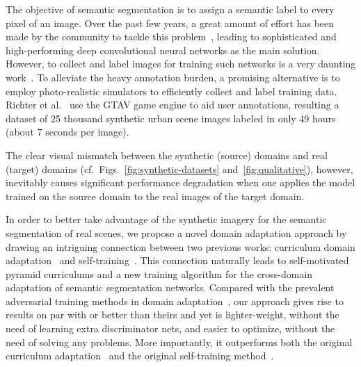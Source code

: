\documentclass[10pt,twocolumn,letterpaper]{article}
\begin{document}
The objective of semantic segmentation is to assign a semantic label to every pixel of an image. Over the past few years, a great amount of effort has been made by the community to tackle this problem~\cite{Long_2015_fcn, deeplab, zhao2017pspnet, deeplabv3plus2018, RefineNet}, leading to sophisticated and high-performing deep convolutional neural networks as the main  solution. However, to collect and label images for training such networks is a very daunting work~\cite{Cordts2016Cityscapes}.  To alleviate the heavy annotation burden, a promising alternative is to employ photo-realistic simulators to efficiently collect and label training data. Richter et al.~\cite{gtav_2016_ECCV} use the GTAV game engine to aid user annotations, resulting a dataset of 25 thousand synthetic urban scene images labeled in only 49 hours (about 7 seconds per image).

The clear visual mismatch  between the synthetic (source) domains and  real (target) domains (cf.~Figs.~\ref{fig:synthetic-datasets} and~\ref{fig:qualitative}), however, inevitably causes significant performance degradation when one applies the model trained on the source domain to the real images of the target domain.


In order to better take advantage of the synthetic imagery for the semantic segmentation of real scenes, we propose a novel domain adaptation approach by drawing an intriguing connection between two previous works: curriculum domain adaptation~\cite{zhang2017curriculum,curriculum_tpami} and self-training~\cite{self_motivated_2018_ECCV}. This connection naturally leads to self-motivated pyramid curriculums and a new training algorithm for the cross-domain adaptation of  semantic segmentation networks. Compared with the prevalent adversarial training methods in domain adaptation~\cite{road_2018_CVPR,fcn_wild,fcan_2018_CVPR, Adaptseg_Tsai_2018_CVPR,I2I_Murez_2018_CVPR, No_Discrimination_2017_ICCV, Hoffman_cycada2017, CGA_Hong_2018_CVPR, Sankaranarayanan_2018_CVPR}, our approach gives rise to results on par with or better than theirs and yet is lighter-weight, without the need of learning extra discriminator nets, and easier to optimize, without the need of solving any  problems. More importantly, it outperforms both the original curriculum adaptation~\cite{curriculum_tpami} and the original self-training method~\cite{self_motivated_2018_ECCV}.
\end{document}
